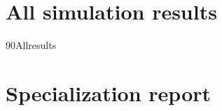 \documentclass[a4paper, 12pt, openany]{book} %
\begin{document}
\chapter{All simulation results}
\label{app:data}
{90Allresults}
\cleardoublepage
\chapter{Specialization report}
\label{app:spec}

%
\end{document}
